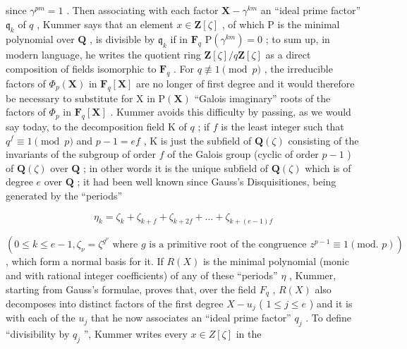since \(\gamma^{pm} = 1\) . Then associating with each factor \(\mathbf{X} - \gamma^{km}\) an ``ideal prime factor'' \(\mathfrak{q}_k\) of \(q\) , Kummer says that an element \(x \in \mathbf{Z}[\zeta]\) , of which P is the minimal polynomial over \(\mathbf{Q}\) , is divisible by \(\mathfrak{q}_k\) if in \(\mathbf{F}_q\) \(\mathrm{P}(\gamma^{km}) = 0\) ; to sum up, in modern language, he writes the quotient ring \(\mathbf{Z}[\zeta]/q\mathbf{Z}[\zeta]\) as a direct composition of fields isomorphic to \(\mathbf{F}_q\) . For \(q \not\equiv 1 \pmod{p}\) , the irreducible factors of \(\Phi_p(\mathbf{X})\) in \(\mathbf{F}_q[\mathbf{X}]\) are no longer of first degree and it would therefore be necessary to substitute for X in \(\mathrm{P}(\mathbf{X})\) ``Galois imaginary'' roots of the factors of \(\Phi_p\) in \(\mathbf{F}_q[\mathbf{X}]\) . Kummer avoids this difficulty by passing, as we would say today, to the decomposition field K of \(q\) ; if \(f\) is the least integer such that \(q^f \equiv 1 \pmod{p}\) and \(p - 1 = ef\) , K is just the subfield of \(\mathbf{Q}(\zeta)\) consisting of the invariants of the subgroup of order \(f\) of the Galois group (cyclic of order \(p - 1\) ) of \(\mathbf{Q}(\zeta)\) over \(\mathbf{Q}\) ; in other words it is the unique subfield of \(\mathbf{Q}(\zeta)\) which is of degree \(e\) over \(\mathbf{Q}\) ; it had been well known since Gauss's Disquisitiones, being generated by the ``periods''

\[
\eta_ {k} = \zeta_ {k} + \zeta_ {k + f} + \zeta_ {k + 2 f} + \dots + \zeta_ {k + (e - 1) f}
\]

\((0 \leqslant k \leqslant e - 1, \zeta_{\nu} = \zeta^{g^{\nu}} \text{ where } g \text{ is a primitive root of the congruence } z^{p-1} \equiv 1 (\text{mod. } p))\) , which form a normal basis for it. If \(R(X)\) is the minimal polynomial (monic and with rational integer coefficients) of any of these ``periods'' \(\eta\) , Kummer, starting from Gauss's formulae, proves that, over the field \(F_q\) , \(R(X)\) also decomposes into distinct factors of the first degree \(X - u_j\) ( \(1 \leqslant j \leqslant e\) ) and it is with each of the \(u_j\) that he now associates an ``ideal prime factor'' \(q_j\) . To define ``divisibility by \(q_j\) '', Kummer writes every \(x \in Z[\zeta]\) in the


